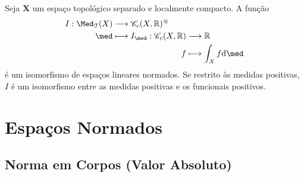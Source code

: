 \begin{prop}
Seja $\bm X$ um espaço topológico separado e localmente compacto. A função
	\begin{align*}
	\func{I}{\Med_\topo(X)}{\cont_c(X,\R)^\circledast}{\med}{
		\begin{aligned}[t]
		\func{I_\med}{\cont_c(X,\R)}{\R}{f}{\int_X f \dd \med}
		\end{aligned}
	}
	\end{align*}
é um isomorfismo de espaços lineares normados. Se restrito às medidas positivas, $I$ é um isomorfismo entre as medidas positivas e os funcionais positivos.
\end{prop}













\chapter{Espaços Normados}

\section{Norma em Corpos (Valor Absoluto)}

